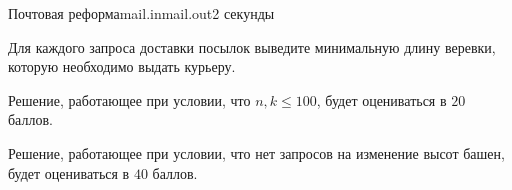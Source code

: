 \begin{problem}{Почтовая реформа}{mail.in}{mail.out}{2 секунды}
\begin{itemize}
\end{itemize}
 
\OutputFile

Для каждого запроса доставки посылок выведите минимальную длину веревки, которую 
необходимо выдать курьеру.

\Examples

\begin{example}%
%
%
\end{example}

\Note
Решение, работающее при условии, что $n,k \le 100$, будет оцениваться в $20$ баллов.

Решение, работающее при условии, что нет запросов на изменение высот башен, будет
оцениваться в $40$ баллов.

\end{problem}
